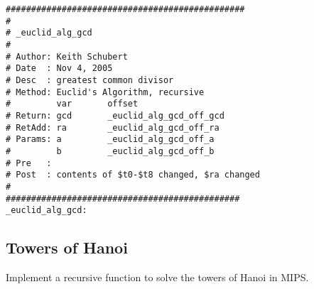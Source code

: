 \begin{verbatim}
###############################################
#
# _euclid_alg_gcd
#
# Author: Keith Schubert
# Date  : Nov 4, 2005
# Desc  : greatest common divisor
# Method: Euclid's Algorithm, recursive
#         var       offset
# Return: gcd       _euclid_alg_gcd_off_gcd
# RetAdd: ra        _euclid_alg_gcd_off_ra
# Params: a         _euclid_alg_gcd_off_a
#         b         _euclid_alg_gcd_off_b
# Pre   :
# Post  : contents of $t0-$t8 changed, $ra changed
#
##############################################
_euclid_alg_gcd:

\end{verbatim}



\subsection{Towers of Hanoi}

Implement a recursive function to solve the towers of Hanoi in MIPS.

